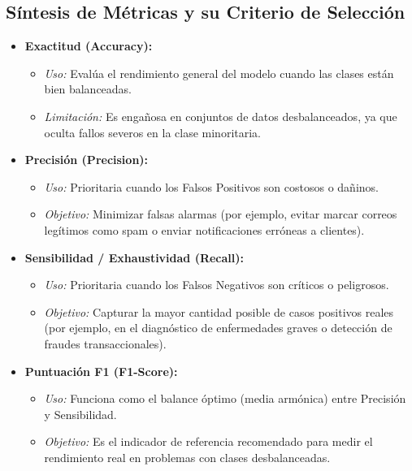 \documentclass[]{article}
\begin{document}
\subsection*{Síntesis de Métricas y su Criterio de Selección}
\begin{itemize}
    \item \textbf{Exactitud (Accuracy):}
    \begin{itemize}
        \item \textit{Uso:} Evalúa el rendimiento general del modelo cuando las clases están bien balanceadas.
        \item \textit{Limitación:} Es engañosa en conjuntos de datos desbalanceados, ya que oculta fallos severos en la clase minoritaria.
    \end{itemize}
    
    \item \textbf{Precisión (Precision):}
    \begin{itemize}
        \item \textit{Uso:} Prioritaria cuando los Falsos Positivos son costosos o dañinos.
        \item \textit{Objetivo:} Minimizar falsas alarmas (por ejemplo, evitar marcar correos legítimos como spam o enviar notificaciones erróneas a clientes).
    \end{itemize}
    
    \item \textbf{Sensibilidad / Exhaustividad (Recall):}
    \begin{itemize}
        \item \textit{Uso:} Prioritaria cuando los Falsos Negativos son críticos o peligrosos.
        \item \textit{Objetivo:} Capturar la mayor cantidad posible de casos positivos reales (por ejemplo, en el diagnóstico de enfermedades graves o detección de fraudes transaccionales).
    \end{itemize}
    
    \item \textbf{Puntuación F1 (F1-Score):}
    \begin{itemize}
        \item \textit{Uso:} Funciona como el balance óptimo (media armónica) entre Precisión y Sensibilidad.
        \item \textit{Objetivo:} Es el indicador de referencia recomendado para medir el rendimiento real en problemas con clases desbalanceadas.
    \end{itemize}
\end{itemize}
\newpage
\end{document}
